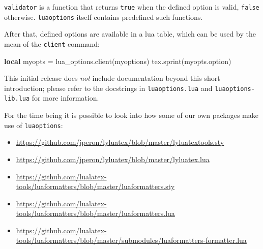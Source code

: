 \documentclass[
]{luaoptionsmanual}
\newenvironment{Shaded}{}{}
\newcommand{\KeywordTok}[1]{\textcolor[rgb]{0.00,0.44,0.13}{\textbf{#1}}}
\newcommand{\NormalTok}[1]{#1}
\newcommand{\OperatorTok}[1]{\textcolor[rgb]{0.40,0.40,0.40}{#1}}
\newcommand{\StringTok}[1]{\textcolor[rgb]{0.25,0.44,0.63}{#1}}
\providecommand{\tightlist}{%
  \setlength{\itemsep}{0pt}\setlength{\parskip}{0pt}}
\begin{document}
\texttt{validator} is a function that returns \texttt{true} when the
defined option is valid, \texttt{false} otherwise. \texttt{luaoptions}
itself contains predefined such functions.

After that, defined options are available in a lua table, which can be
used by the mean of the \texttt{client} command:

\begin{Shaded}
\begin{Highlighting}[]
\KeywordTok{local}\NormalTok{ myopts }\OperatorTok{=}\NormalTok{ lua\_options}\OperatorTok{.}\NormalTok{client}\OperatorTok{(}\StringTok{\textquotesingle{}myoptions\textquotesingle{}}\OperatorTok{)}
\NormalTok{tex}\OperatorTok{.}\NormalTok{sprint}\OperatorTok{(}\NormalTok{myopts}\OperatorTok{.}\NormalTok{option}\OperatorTok{)}
\end{Highlighting}
\end{Shaded}

This initial release does \emph{not} include documentation beyond this
short introduction; please refer to the docstrings in
\texttt{luaoptions.lua} and \texttt{luaoptions-lib.lua} for more
information.

For the time being it is possible to look into how some of our own
packages make use of \texttt{luaoptions}:

\begin{itemize}
\tightlist
\item
  \url{https://github.com/jperon/lyluatex/blob/master/lyluatextools.sty}
\item
  \url{https://github.com/jperon/lyluatex/blob/master/lyluatex.lua}
\item
  \url{https://github.com/lualatex-tools/luaformatters/blob/master/luaformatters.sty}
\item
  \url{https://github.com/lualatex-tools/luaformatters/blob/master/luaformatters.lua}
\item
  \url{https://github.com/lualatex-tools/luaformatters/blob/master/submodules/luaformatters-formatter.lua}
\end{itemize}
\end{document}
